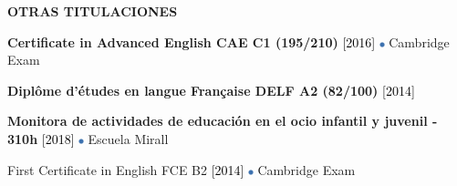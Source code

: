 \documentclass[../main.tex]{subfiles}
\begin{document}
    \vspace*{0.5cm}
    \textbf{\textcolor{myCV2}{OTRAS TITULACIONES\underline{\hspace{5.05cm}}}}
        \vspace*{0.3cm}
        
        \textbf{Certificate in Advanced English CAE C1 (195/210)}
        \textcolor{black}{[2016]}
        \includegraphics[width=0.15cm]{assets/blue.png} 
        Cambridge Exam
        
        \vspace*{0.25cm}
        \textbf{Diplôme d'études en langue Française DELF A2 (82/100)} 
        \textcolor{black}{[2014]}
        
        \vspace*{0.25cm}
        \textbf{Monitora de actividades de educación en el ocio infantil y juvenil - 310h}
        \textcolor{black}{[2018]}
        \includegraphics[width=0.15cm]{assets/blue.png} 
        Escuela Mirall
        
        \vspace*{0.25cm}
        First Certificate in English FCE B2
        \textcolor{black}{[2014]}
        \includegraphics[width=0.15cm]{assets/blue.png} 
        Cambridge Exam 

        

\end{document}
